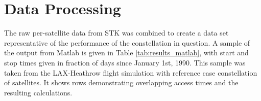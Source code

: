 \section{Data Processing}
\label{sec:data_processing}

The raw per-satellite data from STK was combined to create a data set representative of the performance of the constellation in question. A sample of the output from Matlab is given in Table \ref{tab:results_matlab}, with start and stop times given in fraction of days since January 1st, 1990. This sample was taken from the LAX-Heathrow flight simulation with reference case constellation of satellites. It shows rows demonstrating overlapping access times and the resulting calculations.


